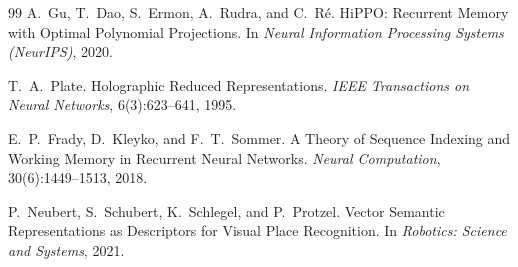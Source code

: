 \documentclass[11pt]{article}
\theoremstyle{definition}
\begin{document}
\begin{thebibliography}{99}
A.\ Gu, T.\ Dao, S.\ Ermon, A.\ Rudra, and C.\ R{\'e}.
\newblock HiPPO: Recurrent Memory with Optimal Polynomial Projections.
\newblock In \emph{Neural Information Processing Systems (NeurIPS)},
  2020.

T.\ A.\ Plate.
\newblock Holographic Reduced Representations.
\newblock \emph{IEEE Transactions on Neural Networks}, 6(3):623--641,
  1995.

E.\ P.\ Frady, D.\ Kleyko, and F.\ T.\ Sommer.
\newblock A Theory of Sequence Indexing and Working Memory in
  Recurrent Neural Networks.
\newblock \emph{Neural Computation}, 30(6):1449--1513, 2018.

P.\ Neubert, S.\ Schubert, K.\ Schlegel, and P.\ Protzel.
\newblock Vector Semantic Representations as Descriptors for Visual
  Place Recognition.
\newblock In \emph{Robotics: Science and Systems}, 2021.

\end{thebibliography}
\end{document}
